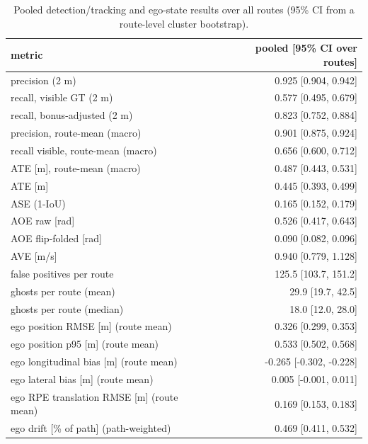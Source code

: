 \begin{table}[t]
\centering
\small
\begin{tabular}{lr}
\toprule
metric & pooled [95\% CI over routes] \\
\midrule
precision (2 m) & 0.925 [0.904, 0.942] \\
recall, visible GT (2 m) & 0.577 [0.495, 0.679] \\
recall, bonus-adjusted (2 m) & 0.823 [0.752, 0.884] \\
precision, route-mean (macro) & 0.901 [0.875, 0.924] \\
recall visible, route-mean (macro) & 0.656 [0.600, 0.712] \\
ATE [m], route-mean (macro) & 0.487 [0.443, 0.531] \\
ATE [m] & 0.445 [0.393, 0.499] \\
ASE (1-IoU) & 0.165 [0.152, 0.179] \\
AOE raw [rad] & 0.526 [0.417, 0.643] \\
AOE flip-folded [rad] & 0.090 [0.082, 0.096] \\
AVE [m/s] & 0.940 [0.779, 1.128] \\
false positives per route & 125.5 [103.7, 151.2] \\
ghosts per route (mean) & 29.9 [19.7, 42.5] \\
ghosts per route (median) & 18.0 [12.0, 28.0] \\
ego position RMSE [m] (route mean) & 0.326 [0.299, 0.353] \\
ego position p95 [m] (route mean) & 0.533 [0.502, 0.568] \\
ego longitudinal bias [m] (route mean) & -0.265 [-0.302, -0.228] \\
ego lateral bias [m] (route mean) & 0.005 [-0.001, 0.011] \\
ego RPE translation RMSE [m] (route mean) & 0.169 [0.153, 0.183] \\
ego drift [\% of path] (path-weighted) & 0.469 [0.411, 0.532] \\
\bottomrule
\end{tabular}
\caption{Pooled detection/tracking and ego-state results over all routes (95\% CI from a route-level cluster bootstrap).}
\label{tab:headline}
\end{table}

